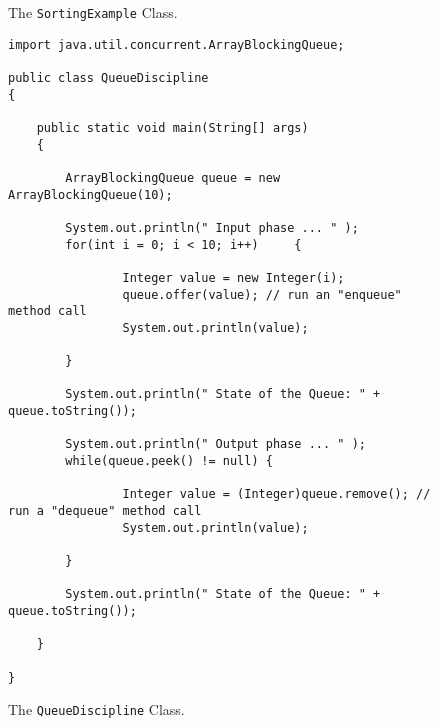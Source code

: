 \documentclass[12pt]{article}
\begin{document}
\begin{enumerate}
\begin{figure}[t]
\caption{The {\tt SortingExample} Class.}
\label{SortingExample}
\end{figure}

%
%
%
%
%

\newpage

\begin{figure}[t]

\footnotesize{
\begin{verbatim}
import java.util.concurrent.ArrayBlockingQueue;

public class QueueDiscipline
{

    public static void main(String[] args)
    {

        ArrayBlockingQueue queue = new ArrayBlockingQueue(10);

        System.out.println(" Input phase ... " );
        for(int i = 0; i < 10; i++)	    {

                Integer value = new Integer(i);
                queue.offer(value); // run an "enqueue" method call
                System.out.println(value);

        }

        System.out.println(" State of the Queue: " + queue.toString());

        System.out.println(" Output phase ... " );
        while(queue.peek() != null) {

                Integer value = (Integer)queue.remove(); // run a "dequeue" method call
                System.out.println(value);

        }

        System.out.println(" State of the Queue: " + queue.toString());

    }

}
\end{verbatim}
}

\caption{The {\tt QueueDiscipline} Class.}
\label{Queue}
\end{figure}




\end{enumerate}
\end{document}
